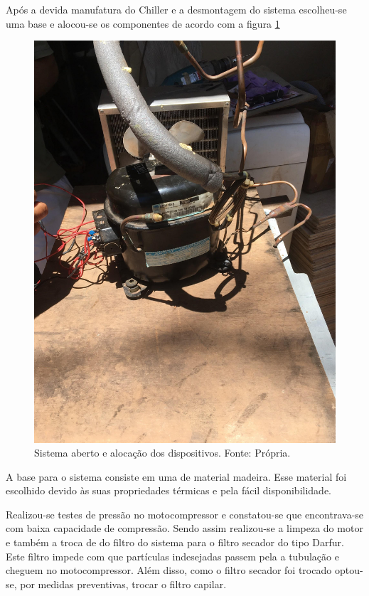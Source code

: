                 Após a devida manufatura do Chiller e a desmontagem do sistema escolheu-se
                uma base e alocou-se os componentes de acordo com a figura \ref{alocacao-dispositivos} 
                \begin{figure}[!htb]
                    \centering
                    \includegraphics[scale= 0.2]{figuras/alocacao-dispositivos.png}
                    \caption{Sistema aberto e alocação dos dispositivos. Fonte: Própria.}
                    \label{alocacao-dispositivos}
                \end{figure}

                A base para o sistema consiste em uma de material madeira. Esse material foi
                escolhido devido às suas propriedades térmicas e pela fácil disponibilidade.
                
                Realizou-se testes de pressão no motocompressor e constatou-se que
                encontrava-se com baixa capacidade de compressão. Sendo assim realizou-se a
                limpeza do motor e também a troca de do filtro do sistema para o filtro secador do tipo
                Darfur. Este filtro impede com que partículas indesejadas passem pela a tubulação e
                cheguem no motocompressor. Além disso, como o filtro secador foi trocado optou-se,
                por medidas preventivas, trocar o filtro capilar.

